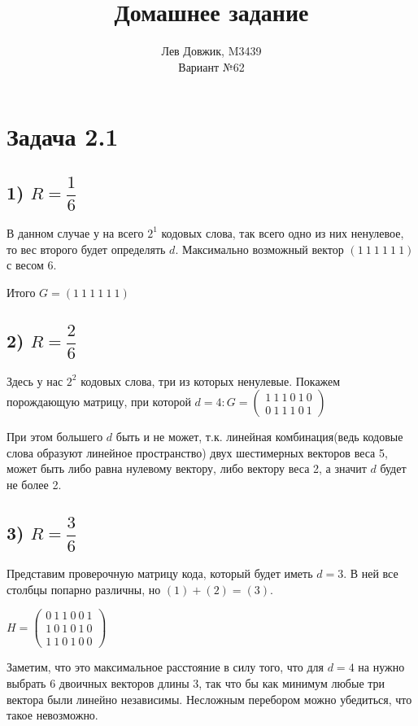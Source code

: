 \documentclass[fontsize=12pt]{article}
\title{Домашнее задание}
\author{Лев Довжик, M3439 \\ Вариант №62}
\date{}
\begin{document}
	\maketitle
	
\section*{Задача 2.1}

\subsection*{1) $R = \dfrac{1}{6}$}

В данном случае у на всего $2^1$ кодовых слова, так всего одно из них ненулевое, то вес второго будет определять $d$. Максимально возможный вектор $(1\ 1\ 1\ 1\ 1\ 1)$ с весом 6. 

Итого $G = (1\ 1\ 1\ 1\ 1\ 1)$

\subsection*{2) $R = \dfrac{2}{6}$}

Здесь у нас $2^2$ кодовых слова, три из которых ненулевые. Покажем порождающую матрицу, при которой $d = 4: 
G = \begin{pmatrix}
	 	1\ 1\ 1\ 0\ 1\ 0\\
		0\ 1\ 1\ 1\ 0\ 1		
	\end{pmatrix}$ 
	
При этом большего $d$ быть и не может, т.к. линейная комбинация(ведь кодовые слова образуют линейное пространство) двух шестимерных векторов веса 5, может быть либо равна нулевому вектору, либо вектору веса 2, а значит $d$ будет не более 2.

\subsection*{3) $R = \dfrac{3}{6}$}

Представим проверочную матрицу кода, который будет иметь $d = 3$. В ней все столбцы попарно различны, но $(1) + (2) = (3)$.

$H = \begin{pmatrix}
	 	0\ 1\ 1\ 0\ 0\ 1\\
		1\ 0\ 1\ 0\ 1\ 0\\
		1\ 1\ 0\ 1\ 0\ 0
	\end{pmatrix}$ 

Заметим, что это максимальное расстояние в силу того, что для $d = 4$ на нужно выбрать 6 двоичных векторов длины 3, так что бы как минимум любые три вектора были линейно независимы. Несложным перебором можно убедиться, что такое невозможно.
\end{document}
